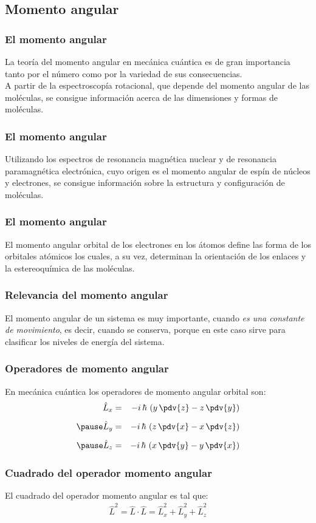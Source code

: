 \subsection{Momento angular}
\begin{frame}
\frametitle{El momento angular}
La teoría del momento angular en mecánica cuántica es de gran importancia tanto por el número como por la variedad de sus consecuencias.
\\
\bigskip
\pause
A partir de la espectroscopía rotacional, que depende del momento angular de las moléculas, se consigue información acerca de las dimensiones y formas de moléculas.
\end{frame}
\begin{frame}
\frametitle{El momento angular}
Utilizando los espectros de resonancia magnética nuclear y de resonancia paramagnética electrónica, cuyo origen es el momento angular de espín de núcleos y electrones, se consigue información sobre la estructura y configuración de moléculas.
\end{frame}
\begin{frame}
\frametitle{El momento angular}
El momento angular orbital de los electrones en los átomos define las forma de los orbitales atómicos los cuales, a su vez, determinan la orientación de los enlaces y la estereoquímica de las moléculas.
\end{frame}
\begin{frame}
\frametitle{Relevancia del momento angular}
El momento angular de un sistema es muy importante, cuando \emph{es una constante de movimiento}, es decir, cuando se conserva, porque en este caso sirve para clasificar los niveles de energía del sistema.
\end{frame}
\begin{frame}
\frametitle{Operadores de momento angular}
En mecánica cuántica los operadores de momento angular orbital son:
\begin{eqnarray}
\begin{aligned}
\hat{L}_{x} &=& - i \, \hbar \, \left( y \, \pdv{z} - z \, \pdv{y} \right) \\[0.5em] \pause
\hat{L}_{y} &=& - i \, \hbar \, \left( z \, \pdv{x} - x \, \pdv{z} \right) \\[0.5em] \pause
\hat{L}_{z} &=& - i \, \hbar \, \left( x \, \pdv{y} - y \, \pdv{x} \right)
\end{aligned}
\label{eq:ecuacion_01_03a}
\end{eqnarray}
\end{frame}
\begin{frame}
\frametitle{Cuadrado del operador momento angular}
El cuadrado del operador momento angular es tal que:
\begin{align}
\hat{L}^{2} = \hat{L} \cdot \hat{L} = \hat{L}_{x}^{2} + \hat{L}_{y}^{2} + \hat{L}_{z}^{2}
\label{eq:ecuacion_01_03b}
\end{align}
\end{frame}
